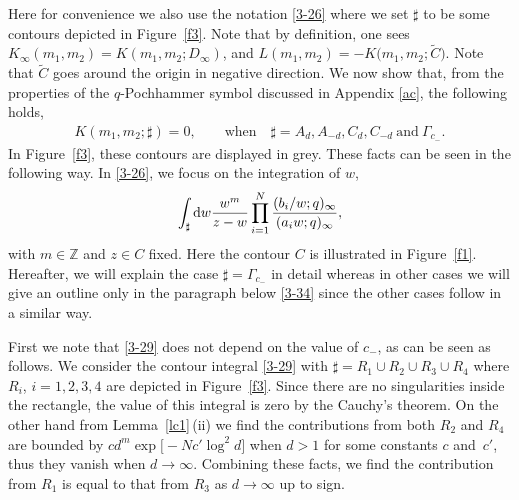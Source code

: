\documentclass[pdftex]{sigma}
\numberwithin{equation}{section}
\def\i{\infty}
\def\Z{\mathbb{Z}}
\begin{document}
 Here for convenience we also use
 the notation \eqref{3-26} where
 we set $\sharp$ to be some contours
 depicted in
 Figure~\ref{f3}. Note that by definition, one sees
 $K_{\infty}(m_1,m_2)= K(m_1,m_2;D_{\i})$,
 and ${L(m_1,m_2)=-K\big(m_1,m_2;\tilde{C}\big)}$.
 Note that $\tilde{C}$ goes around the origin in negative direction.
 We now show that,
 from the properties of the $q$-Pochhammer symbol discussed in
 Appendix \ref{ac}, the following holds,
\begin{align}
\label{s34-2}
 K(m_1,m_2;\sharp)=0,
 \qquad \text{when}\quad \sharp=A_d,A_{-d},C_d,C_{-d}\ \text{and}\ \Gamma_{c_-}.
\end{align}
 In Figure~\ref{f3}, these contours
 are displayed in grey.
 These facts can be
 seen in the following way.
 In \eqref{3-26}, we focus on the
 integration of $w$,
 \begin{align}
 \label{3-29}
 \int_{\sharp}{\rm d}w\frac{w^{m}}{z-w}
 \prod_{i=1}^N
 \frac{{(b_i/w;q)_{\i}}}{(a_iw;q)_{\i}},
 \end{align}
 with $m\in\Z$ and $z\in C$ fixed. Here the contour $C$ is illustrated in Figure~\ref{f1}.
 Hereafter, we will explain the case $\sharp=\Gamma_{c_-}$ in detail whereas in other cases we will give an outline only in the paragraph below \eqref{3-34} since
 the other cases follow in a similar
 way.

 First we note that \eqref{3-29} does not depend on the value of $c_-$, as can be seen as follows. We consider the contour integral \eqref{3-29}
 with $\sharp=R_1\cup R_2\cup R_3\cup R_4$ where $R_i$, $i=1,2,3,4$ are depicted in
 Figure~\ref{f3}. Since there are no singularities inside the rectangle, the value of this integral is zero by the Cauchy's theorem. On the other hand
 from Lemma~\ref{lc1}\,(ii) we find the contributions from both $R_2$ and $R_4$ are bounded by $cd^m \exp\bigl[-Nc'\log^2 d\bigr]$ when $d>1$ for some constants $c$ and~$c'$, thus they vanish when $d\rightarrow\i$. Combining these facts, we find
 the contribution from $R_1$ is equal to that from $R_3$
 as $d\rightarrow\i$ up to sign.
\end{document}
